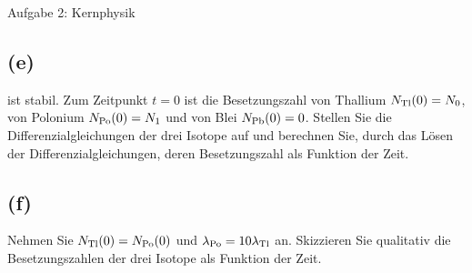 \begin{aufgabe}{Aufgabe 2: Kernphysik}
    \subsection{(e)}
     ist stabil.
    Zum  Zeitpunkt $t = 0$ ist die Besetzungszahl
    von Thallium $N_{\ce{Tl}}(0) = N_0$,
    von Polonium $N_{\ce{Po}}(0) = N_1$ und
    von Blei     $N_{\ce{Pb}}(0) = 0$.
    Stellen Sie die Differenzialgleichungen der drei Isotope auf und berechnen Sie,
    durch das Lösen der Differenzialgleichungen,
    deren Besetzungszahl als Funktion der Zeit.

    \subsection{(f)}
    Nehmen Sie $N_{\ce{Tl}}(0) = N_{\ce{Po}}(0)$ und $\lambda_{\ce{Po}} = 10 \lambda_{\ce{Tl}}$ an.
    Skizzieren Sie qualitativ die Besetzungszahlen der drei Isotope als Funktion der Zeit.
\end{aufgabe}

